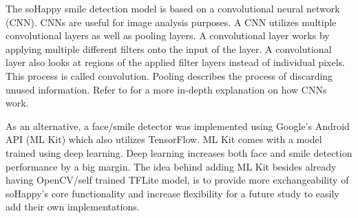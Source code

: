 The soHappy smile detection model is based on a convolutional neural network 
(CNN). CNNs are useful for image analysis purposes. A CNN utilizes multiple
convolutional layers as well as pooling layers. A convolutional layer works by
applying multiple different filters onto the input of the layer. A 
convolutional layer also looks at regions of the applied filter layers instead 
of individual pixels. This process is called convolution.
Pooling describes the process of discarding unused information.
Refer to \cite{8308186} for a more in-depth explanation on how CNNs work.

As an alternative, a face/smile detector was implemented using Google's Android API (ML Kit) \cite{mlkit} which also utilizes TensorFlow.
ML Kit comes with a model trained using deep learning.
Deep learning increases both face and smile detection performance by a big margin.
The idea behind adding ML Kit besides already having OpenCV/self trained TFLite model, is to provide more exchangeability of soHappy's core functionality and increase flexibility for a future study to easily add their own implementations.

